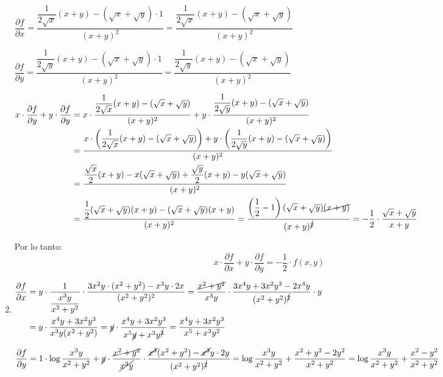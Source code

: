 \begin{enumerate}[label=\color{red}\textbf{\arabic*)}, leftmargin=*]
$\dfrac{\partial f}{\partial x}=\dfrac{\dfrac{1}{2\sqrt{x}}(x+y)-(\sqrt{x}+\sqrt{y})\cdot1}{(x+y)^{2}}=\dfrac{\dfrac{1}{2\sqrt{x}}(x+y)-(\sqrt{x}+\sqrt{y})}{(x+y)^{2}}$

$\dfrac{\partial f}{\partial y}=\dfrac{\dfrac{1}{2\sqrt{y}}(x+y)-(\sqrt{x}+\sqrt{y})\cdot1}{(x+y)^{2}}=\dfrac{\dfrac{1}{2\sqrt{y}}(x+y)-(\sqrt{x}+\sqrt{y})}{(x+y)^{2}}$

$\begin{aligned}
x\cdot\dfrac{\partial f}{\partial y}+y\cdot\dfrac{\partial f}{\partial y}&=x\cdot\dfrac{\dfrac{1}{2\sqrt{x}}(x+y)-(\sqrt{x}+\sqrt{y})}{(x+y)^{2}}+y\cdot\dfrac{\dfrac{1}{2\sqrt{y}}(x+y)-(\sqrt{x}+\sqrt{y})}{(x+y)^{2}}\\
&=\dfrac{x\cdot\left(\dfrac{1}{2\sqrt{x}}(x+y)-(\sqrt{x}+\sqrt{y})\right)+y\cdot\left(\dfrac{1}{2\sqrt{y}}(x+y)-(\sqrt{x}+\sqrt{y})\right)}{(x+y)^{2}}\\
& =\dfrac{\dfrac{\sqrt{x}}{2}(x+y)-x(\sqrt{x}+\sqrt{y})+\dfrac{\sqrt{y}}{2}(x+y)-y(\sqrt{x}+\sqrt{y})}{(x+y)^2}\\
&=\dfrac{\dfrac{1}{2}(\sqrt{x}+\sqrt{y})(x+y)-(\sqrt{x}+\sqrt{y})(x+y)}{(x+y)^{2}}=\dfrac{\left(\dfrac{1}{2}-1\right)(\sqrt{x}+\sqrt{y})\cancel{(x+y)}}{(x+y)^{\cancel{2}}}=-\dfrac{1}{2}\cdot\dfrac{\sqrt{x}+\sqrt{y}}{x+y}
\end{aligned}$

Por lo tanto: \[ x\cdot\dfrac{\partial f}{\partial x}+y\cdot\dfrac{\partial f}{\partial y}=-\dfrac{1}{2}\cdot f(x,y) \]

\item {}

$\begin{aligned}
\dfrac{\partial f}{\partial x}&=y\cdot\dfrac{1}{\dfrac{x^{3}y}{x^{2}+y^{2}}}\cdot\dfrac{3x^{2}y\cdot(x^{2}+y^{2})-x^{3}y\cdot2x}{(x^{2}+y^{2})^{2}}=\dfrac{\cancel{x^{2}+y^{2}}}{x^{3}y}\cdot\dfrac{3x^{4}y+3x^{2}y^{3}-2x^{4}y}{(x^{2}+y^{2})^{\cancel{2}}}\cdot y\\
&=y\cdot\dfrac{x^{4}y+3x^{2}y^{3}}{x^{3}y(x^{2}+y^{2})}=\cancel{y}\cdot\dfrac{x^{4}y+3x^{2}y^{3}}{x^{5}\cancel{y}+x^{3}y^{\cancel{3}}}=\dfrac{x^{4}y+3x^{2}y^{3}}{x^{5}+x^{3}y^{2}}
\end{aligned}$

$\dfrac{\partial f}{\partial y}=1\cdot\log\dfrac{x^{3}y}{x^{2}+y^{2}}+\cancel{y}\cdot\dfrac{\cancel{x^{2}+y^{2}}}{\cancel{x^{3}y}}\cdot\dfrac{\cancel{x^{3}}(x^{2}+y^{2})-\cancel{x^{3}}y\cdot2y}{(x^{2}+y^{2})^{\cancel{2}}}=\log\dfrac{x^{3}y}{x^{2}+y^{2}}+\dfrac{x^{2}+y^{2}-2y^{2}}{x^{2}+y^{2}}=\log\dfrac{x^{3}y}{x^{2}+y^{2}}+\dfrac{x^{2}-y^{2}}{x^{2}+y^{2}}$


\end{enumerate}
